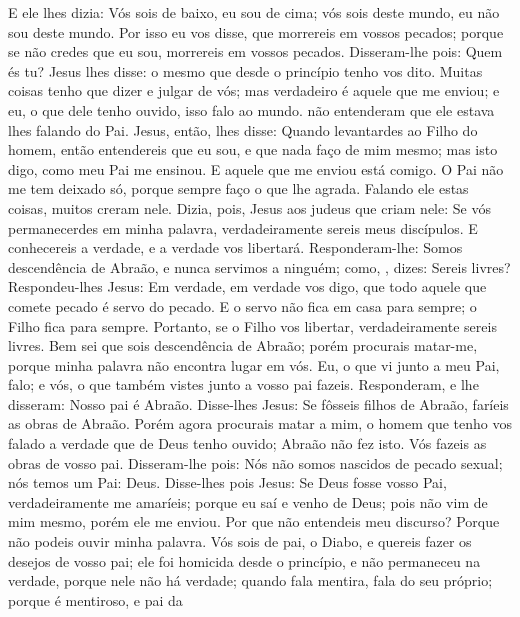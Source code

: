 {  E ele lhes dizia: Vós sois de baixo, eu sou de cima; vós sois deste mundo, eu não sou deste mundo.
  Por isso eu vos disse, que morrereis em vossos pecados; porque se não credes que eu sou, morrereis em vossos pecados.
  Disseram-lhe pois: Quem és tu? Jesus lhes disse:
{} o mesmo que desde o princípio tenho vos dito.
  Muitas coisas tenho que dizer e julgar de vós; mas verdadeiro é aquele que me enviou; e eu, o que dele tenho ouvido, isso falo ao mundo.
   não entenderam que ele estava lhes falando do Pai.
  Jesus, então, lhes disse: Quando levantardes ao Filho do homem, então entendereis que eu sou, e que nada faço de mim mesmo; mas isto digo, como meu Pai me ensinou.
  E aquele que me enviou está comigo. O Pai não me tem deixado só, porque sempre faço o que lhe agrada.
  Falando ele estas coisas, muitos creram nele.
  Dizia, pois, Jesus aos judeus que criam nele: Se vós permanecerdes em minha palavra, verdadeiramente sereis meus discípulos.
  E conhecereis a verdade, e a verdade vos libertará.
  Responderam-lhe: Somos descendência
 de Abraão, e nunca servimos a ninguém; como,
{},  dizes: Sereis livres?
  Respondeu-lhes Jesus: Em verdade, em verdade vos digo, que todo aquele que comete pecado é servo do pecado.
  E o servo não fica em casa para sempre; o Filho fica para sempre.
  Portanto, se o Filho vos libertar, verdadeiramente sereis livres.
  Bem sei que sois descendência
 de Abraão; porém procurais matar-me, porque minha palavra não encontra lugar em vós.
  Eu, o que vi junto a meu Pai,
{} falo; e vós, o que também vistes junto a vosso pai
{} fazeis.
  Responderam, e lhe disseram: Nosso pai é Abraão. Disse-lhes Jesus: Se fôsseis filhos de Abraão, faríeis as obras de Abraão.
  Porém agora procurais matar a mim, o homem que tenho vos falado a verdade que de Deus tenho ouvido; Abraão não fez isto.
  Vós fazeis as obras de vosso pai. Disseram-lhe pois: Nós não somos nascidos de pecado sexual; nós temos um Pai: Deus.
  Disse-lhes pois Jesus: Se Deus fosse vosso Pai, verdadeiramente me amaríeis; porque eu saí e venho de Deus; pois não vim de mim mesmo, porém ele me enviou.
  Por que não entendeis meu discurso? Porque não podeis ouvir minha palavra.
  Vós sois
{} de
{} pai, o Diabo, e quereis fazer os desejos de vosso pai; ele foi homicida desde o princípio, e não permaneceu na verdade, porque nele não há verdade; quando fala mentira, fala do seu próprio; porque é mentiroso, e pai da
}
